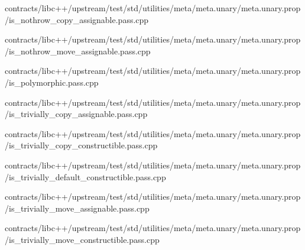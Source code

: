 \begin{DoxyCompactItemize}
contracts/libc++/upstream/test/std/utilities/meta/meta.\+unary/meta.\+unary.\+prop/is\+\_\+nothrow\+\_\+copy\+\_\+assignable.\+pass.\+cpp\item 
contracts/libc++/upstream/test/std/utilities/meta/meta.\+unary/meta.\+unary.\+prop/is\+\_\+nothrow\+\_\+move\+\_\+assignable.\+pass.\+cpp\item 
contracts/libc++/upstream/test/std/utilities/meta/meta.\+unary/meta.\+unary.\+prop/is\+\_\+polymorphic.\+pass.\+cpp\item 
contracts/libc++/upstream/test/std/utilities/meta/meta.\+unary/meta.\+unary.\+prop/is\+\_\+trivially\+\_\+copy\+\_\+assignable.\+pass.\+cpp\item 
contracts/libc++/upstream/test/std/utilities/meta/meta.\+unary/meta.\+unary.\+prop/is\+\_\+trivially\+\_\+copy\+\_\+constructible.\+pass.\+cpp\item 
contracts/libc++/upstream/test/std/utilities/meta/meta.\+unary/meta.\+unary.\+prop/is\+\_\+trivially\+\_\+default\+\_\+constructible.\+pass.\+cpp\item 
contracts/libc++/upstream/test/std/utilities/meta/meta.\+unary/meta.\+unary.\+prop/is\+\_\+trivially\+\_\+move\+\_\+assignable.\+pass.\+cpp\item 
contracts/libc++/upstream/test/std/utilities/meta/meta.\+unary/meta.\+unary.\+prop/is\+\_\+trivially\+\_\+move\+\_\+constructible.\+pass.\+cpp\end{DoxyCompactItemize}
